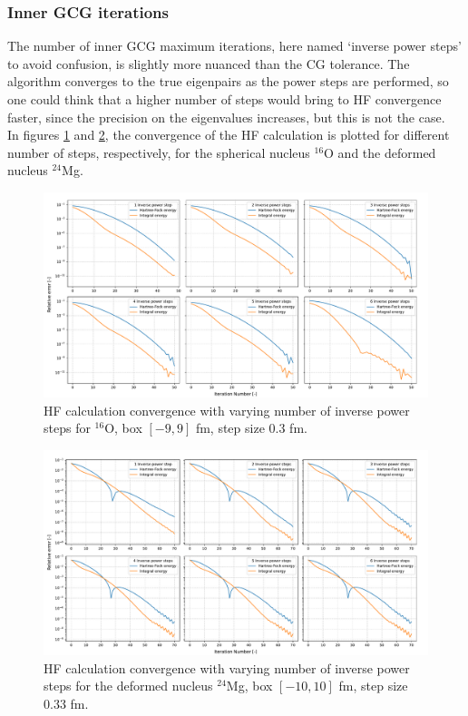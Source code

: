 \subsubsection{Inner GCG iterations}
The number of inner GCG maximum iterations, here named `inverse power steps' to avoid confusion, is slightly more nuanced than the CG tolerance. The algorithm converges to the true eigenpairs as the power steps are performed, so one could think that a higher number of steps would bring to HF convergence faster, since the precision on the eigenvalues increases, but this is not the case.
\\In figures \ref{fig:conv_steps_o} and \ref{fig:conv_steps_mg}, the convergence of the HF calculation is plotted for different number of steps, respectively, for the spherical nucleus $^{16}$O and the deformed nucleus $^{24}$Mg. 
\begin{figure}[h]
    \centering
    \includegraphics[width=1.0\textwidth]{Images/conv_steps_o.pdf}
    \caption{HF calculation convergence with varying number of inverse power steps for $^{16}$O, box $[-9, 9]$ fm, step size $0.3$ fm.}
    \label{fig:conv_steps_o}
\end{figure}
\begin{figure}[h]
    \centering
    \includegraphics[width=1.0\textwidth]{Images/conv_steps.pdf}
    \caption{HF calculation convergence with varying number of inverse power steps for the deformed nucleus $^{24}$Mg, box $[-10, 10]$ fm, step size $0.33$ fm.}
    \label{fig:conv_steps_mg}
\end{figure}
